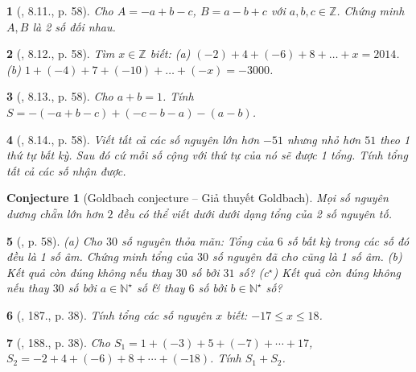 \documentclass{article}
\newtheorem{baitoan}{}
\newtheorem{conjecture}{Conjecture}
\begin{document}
\begin{baitoan}[\cite{Binh_boi_duong_Toan_6_tap_1}, 8.11., p. 58]
	Cho $A = -a + b - c$, $B = a - b + c$ với $a,b,c\in\mathbb{Z}$. Chứng minh $A,B$ là 2 số đối nhau.
\end{baitoan}

\begin{baitoan}[\cite{Binh_boi_duong_Toan_6_tap_1}, 8.12., p. 58]
	Tìm $x\in\mathbb{Z}$ biết: (a) $(-2) + 4 + (-6) + 8 + \ldots + x = 2014$. (b) $1 + (-4) + 7 + (-10) + \ldots + (-x) = -3000$.
\end{baitoan}

\begin{baitoan}[\cite{Binh_boi_duong_Toan_6_tap_1}, 8.13., p. 58]
	Cho $a + b = 1$. Tính $S = -(-a + b - c) + (-c - b - a) - (a - b)$.
\end{baitoan}

\begin{baitoan}[\cite{Binh_boi_duong_Toan_6_tap_1}, 8.14., p. 58]
	Viết tất cả các số nguyên lớn hơn $-51$ nhưng nhỏ hơn $51$ theo 1 thứ tự bất kỳ. Sau đó cứ mỗi số cộng với thứ tự của nó sẽ được 1 tổng. Tính tổng tất cả các số nhận được.
\end{baitoan}

\begin{conjecture}[Goldbach conjecture -- Giả thuyết Goldbach]
	Mọi số nguyên dương chẵn lớn hơn $2$ đều có thể viết dưới dưới dạng tổng của 2 số nguyên tố.
\end{conjecture}

\begin{baitoan}[\cite{Binh_boi_duong_Toan_6_tap_1}, p. 58]
	(a) Cho $30$ số nguyên thỏa mãn: Tổng của $6$ số bất kỳ trong các số đó đều là 1 số âm. Chứng minh tổng của $30$ số nguyên đã cho cũng là 1 số âm. (b) Kết quả còn đúng không nếu thay $30$ số bởi $31$ số? (c${}^\star$) Kết quả còn đúng không nếu thay $30$ số bởi $a\in\mathbb{N}^\star$ số \& thay $6$ số bởi $b\in\mathbb{N}^\star$ số?
\end{baitoan}

\begin{baitoan}[\cite{Tuyen_Toan_6}, 187., p. 38]
	Tính tổng các số nguyên $x$ biết: $-17\le x\le18$.
\end{baitoan}

\begin{baitoan}[\cite{Tuyen_Toan_6}, 188., p. 38]
	Cho $S_1 = 1 + (-3) + 5 + (-7) + \cdots + 17$, $S_2 = -2 + 4 + (-6) + 8 + \cdots + (-18)$. Tính $S_1 + S_2$.
\end{baitoan}
\end{document}
